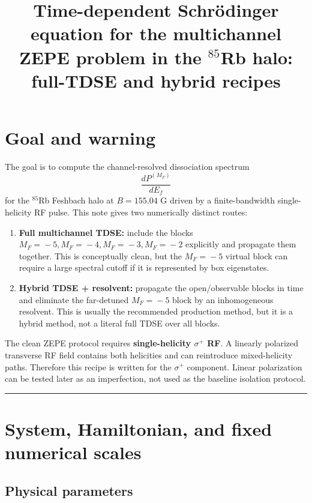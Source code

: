 \documentclass[11pt,a4paper]{article}
\title{\textbf{Time-dependent Schr\"odinger equation for the multichannel\\
ZEPE problem in the $^{85}$Rb halo: full-TDSE and hybrid recipes}}
\author{}
\date{}
\newcommand{\MF}[1]{M_F\!=\!#1}
\begin{document}
\maketitle
\vspace{-2.2em}

\section*{Goal and warning}

The goal is to compute the channel-resolved dissociation spectrum
\begin{equation}
  \frac{dP^{(M_F)}}{dE_f}
\end{equation}
for the $^{85}$Rb Feshbach halo at $B=155.04$ G driven by a finite-bandwidth
single-helicity RF pulse.  This note gives two numerically distinct routes:

\begin{enumerate}[leftmargin=2em,itemsep=2pt]
\item \textbf{Full multichannel TDSE:} include the blocks
$\MF{-5},\MF{-4},\MF{-3},\MF{-2}$ explicitly and propagate them together.
This is conceptually clean, but the $\MF{-5}$ virtual block can require a
large spectral cutoff if it is represented by box eigenstates.
\item \textbf{Hybrid TDSE + resolvent:} propagate the open/observable blocks in
time and eliminate the far-detuned $\MF{-5}$ block by an inhomogeneous
resolvent.  This is usually the recommended production method, but it is a
hybrid method, not a literal full TDSE over all blocks.
\end{enumerate}

The clean ZEPE protocol requires \textbf{single-helicity $\sigma^+$ RF}.  A
linearly polarized transverse RF field contains both helicities and can
reintroduce mixed-helicity paths.  Therefore this recipe is written for the
$\sigma^+$ component.  Linear polarization can be tested later as an
imperfection, not used as the baseline isolation protocol.

\medskip\hrule\medskip

\section{System, Hamiltonian, and fixed numerical scales}

\subsection{Physical parameters}
\end{document}
